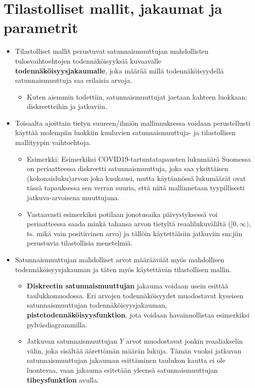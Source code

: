 \documentclass[
]{book}
\providecommand{\tightlist}{%
  \setlength{\itemsep}{0pt}\setlength{\parskip}{0pt}}
\begin{document}
\hypertarget{alaluku43}{%
\section{Tilastolliset mallit, jakaumat ja parametrit}\label{alaluku43}}

\begin{itemize}
\tightlist
\item
  Tilastolliset mallit perustuvat satunnaismuuttujan mahdollisten tulosvaihtoehtojen todennäköisyyksiä kuvaavalle \textbf{todennäköisyysjakaumalle}, joka määrää millä todennäköisyydellä satunnaismuuttuja saa erilaisia arvoja.

  \begin{itemize}
  \tightlist
  \item
    Kuten aiemmin todettiin, satunnaismuuttujat jaetaan kahteen luokkaan: diskreetteihin ja jatkuviin.
  \end{itemize}
\item
  Toisaalta ajoittain tietyn suureen/ilmiön mallinnuksessa voidaan perustellusti käyttää molempiin luokkiin kuuluvien satunnaismuuttuja- ja tilastollisen mallityypin vaihtoehtoja.

  \begin{itemize}
  \tightlist
  \item
    Esimerkki: Esimerkiksi COVID19-tartuntatapausten lukumäärä Suomessa on periaatteessa diskreetti satunnaismuuttuja, joka saa yksittäisen (kokonaisluku)arvon joka kuukausi, mutta käytännössä lukumäärät ovat tässä tapauksessa sen verran suuria, että niitä mallinnetaan tyypillisesti jatkuva-arvoisena muuttujana.
  \item
    Vastaavasti esimerkiksi potilaan jonotusaika päivystyksessä voi periaatteessa saada minkä tahansa arvon tietyltä reaalilukuväliltä (\([0,\infty)\), ts. mikä vain positiivinen arvo) ja tällöin käytettäisiin jatkuviin sm:jiin perustuvia tilastollisia menetelmiä.
  \end{itemize}
\item
  Satunnaismuuttujan mahdolliset arvot määrääväät myös mahdollisen todennäköisyysjakauman ja täten myös käytettävän tilastollisen mallin.

  \begin{itemize}
  \tightlist
  \item
    \textbf{Diskreetin satunnaismuuttujan} jakauma voidaan usein esittää taulukkomuodossa. Eri arvojen todennäköisyydet muodostavat kyseisen satunnaismuuttujan todennäköisyysjakauman, \textbf{pistetodennäköisyysfunktion}, jota voidaan havainnollistaa esimerkiksi pylväsdiagrammilla.
  \item
    Jatkuvan satunnaismuuttujan \(Y\) arvot muodostavat jonkin reaaliakselin välin, joka sisältää äärettömän määrän lukuja. Tämän vuoksi jatkuvan satunnaismuuttujan jakauman esittäminen taulukon kautta ei ole luontevaa, vaan jakauma esitetään yleensä satunnaismuuttujan \textbf{tiheysfunktion} avulla.


\end{itemize}
\end{itemize}
\end{document}

